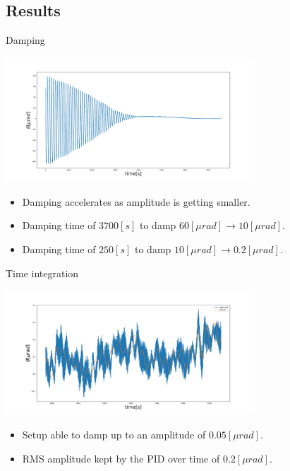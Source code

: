 \documentclass{beamer}
\begin{document}
\subsection{Results}
\begin{frame}{Damping}
	\begin{center}		
		\includegraphics[width=0.7\textwidth,keepaspectratio]{measured oscillation angle.png}
	\end{center}
	\begin{itemize}	
		
		\item Damping accelerates as amplitude is getting smaller.
		\item Damping time of $3700[s]$ to damp  $ 60 [\mu rad] \rightarrow 10[\mu rad] $.
		\item Damping time of $250[s]$ to damp  $ 10 [\mu rad] \rightarrow 0.2[\mu rad] $.

						
	\end{itemize}
\end{frame}
\begin{frame}{Time integration}
	\begin{center}		
		\includegraphics[width=0.7\textwidth,keepaspectratio]{measured oscillation angle1.png}
	\end{center}
	\begin{itemize}	
		\item Setup able to damp up to an amplitude of $0.05[\mu rad]$.
		\item RMS amplitude kept by the PID over time of $ 0.2 [\mu rad]$.	
		
						
	\end{itemize}
\end{frame}
\end{document}
